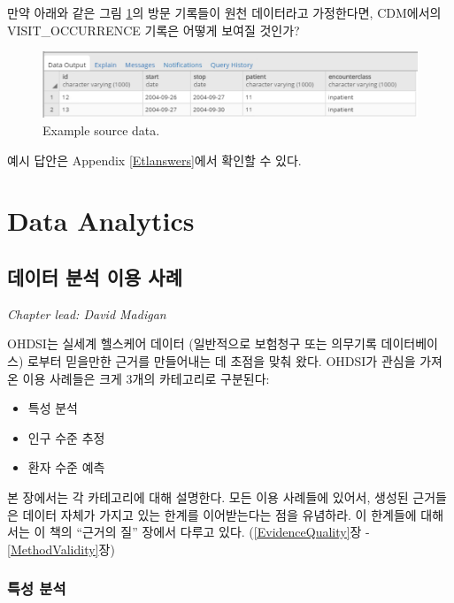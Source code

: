 \documentclass[11pt]{book}
\providecommand{\tightlist}{%
  \setlength{\itemsep}{0pt}\setlength{\parskip}{0pt}}
\theoremstyle{definition}
\theoremstyle{definition}
\theoremstyle{definition}
\theoremstyle{remark}
\begin{document}
만약 아래와 같은 그림 \ref{fig:exerciseSourceData}의 방문 기록들이 원천
데이터라고 가정한다면, CDM에서의 VISIT\_OCCURRENCE 기록은 어떻게 보여질
것인가?

\begin{figure}

{\centering \includegraphics[width=1\linewidth]{images/ExtractTransformLoad/exerciseSourceData} 

}

\caption{Example source data.}\label{fig:exerciseSourceData}
\end{figure}

예시 답안은 Appendix \ref{Etlanswers}에서 확인할 수 있다.

\part{Data Analytics}\label{part-data-analytics}

\chapter{데이터 분석 이용 사례}\label{DataAnalyticsUseCases}

\emph{Chapter lead: David Madigan}

OHDSI는 실세계 헬스케어 데이터 (일반적으로 보험청구 또는 의무기록
데이터베이스) 로부터 믿을만한 근거를 만들어내는 데 초점을 맞춰 왔다.
OHDSI가 관심을 가져온 이용 사례들은 크게 3개의 카테고리로 구분된다:

\begin{itemize}
\tightlist
\item
  특성 분석
\item
  인구 수준 추정
\item
  환자 수준 예측
\end{itemize}

본 장에서는 각 카테고리에 대해 설명한다. 모든 이용 사례들에 있어서,
생성된 근거들은 데이터 자체가 가지고 있는 한계를 이어받는다는 점을
유념하라. 이 한계들에 대해서는 이 책의 ``근거의 질'' 장에서 다루고 있다.
(\ref{EvidenceQuality}장 - \ref{MethodValidity}장)

\section{특성 분석}\label{-}
\end{document}
